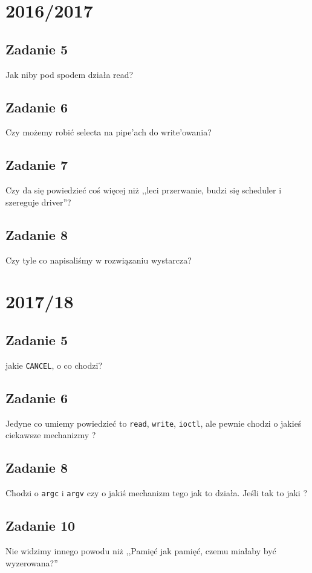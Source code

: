 \section{2016/2017}
\subsection{Zadanie 5}
Jak niby pod spodem działa read?

\subsection{Zadanie 6}
Czy możemy robić selecta na pipe'ach do write'owania?

\subsection{Zadanie 7}
Czy da się powiedzieć coś więcej niż ,,leci przerwanie, budzi się scheduler i szereguje driver''?

\subsection{Zadanie 8}
Czy tyle co napisaliśmy w rozwiązaniu wystarcza?

\section{2017/18}
\subsection{Zadanie 5}
jakie \texttt{CANCEL}, o co chodzi?

\subsection{Zadanie 6}
Jedyne co umiemy powiedzieć to \texttt{read}, \texttt{write}, \texttt{ioctl}, ale pewnie chodzi o jakieś ciekawsze mechanizmy ?

\subsection{Zadanie 8}
Chodzi o \texttt{argc} i \texttt{argv} czy o jakiś mechanizm tego jak to działa. Jeśli tak to jaki ?

\subsection{Zadanie 10}
Nie widzimy innego powodu niż ,,Pamięć jak pamięć, czemu miałaby być wyzerowana?''

